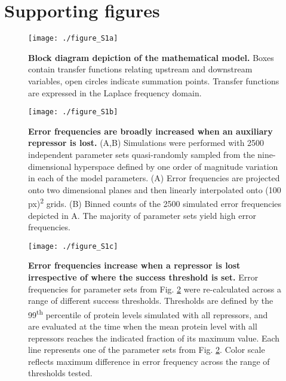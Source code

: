 \graphicspath{ {./figures/metabolism/} }


\section{Supporting figures}

\begin{figure}[h!]
\centering
\texttt{[image: ./figure\_S1a]}
\captionsetup{width=.65\linewidth}
\caption[Block diagram depiction of the mathematical model.]{\textbf{Block diagram depiction of the mathematical model.} Boxes contain transfer functions relating upstream and downstream variables, open circles indicate summation points. Transfer functions are expressed in the Laplace frequency domain.}
\label{fig:metabolism:figS1a}
\end{figure}

\begin{figure}[h!]
\centering
\texttt{[image: ./figure\_S1b]}
\caption[Error frequencies are broadly increased when an auxiliary repressor is lost.]{\textbf{Error frequencies are broadly increased when an auxiliary repressor is lost.} (A,B) Simulations were performed with 2500 independent parameter sets quasi-randomly sampled from the nine-dimensional hyperspace defined by one order of magnitude variation in each of the model parameters. (A) Error frequencies are projected onto two dimensional planes and then linearly interpolated onto (100 px)\textsuperscript{2} grids. (B) Binned counts of the 2500 simulated error frequencies depicted in A. The majority of parameter sets yield high error frequencies.}
\label{fig:metabolism:figS1b}
\end{figure}

\begin{figure}[h!]
\centering
\texttt{[image: ./figure\_S1c]}
\captionsetup{width=.65\linewidth}
\caption[Error frequencies increase when a repressor is lost irrespective of where the success threshold is set.]{\textbf{Error frequencies increase when a repressor is lost irrespective of where the success threshold is set.} Error frequencies for parameter sets from Fig. \ref{fig:metabolism:figS1b} were re-calculated across a range of different success thresholds. Thresholds are defined by the 99\textsuperscript{th} percentile of protein levels simulated with all repressors, and are evaluated at the time when the mean protein level with all repressors reaches the indicated fraction of its maximum value. Each line represents one of the parameter sets from Fig. \ref{fig:metabolism:figS1b}. Color scale reflects maximum difference in error frequency across the range of thresholds tested.}
\label{fig:metabolism:figS1c}
\end{figure}

